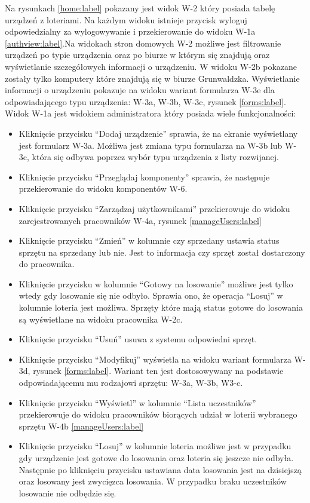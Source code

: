 Na rysunkach \ref{home:label} pokazany jest widok W-2 który posiada tabelę urządzeń z loteriami. Na każdym widoku istnieje przycisk wyloguj odpowiedzialny za wylogowywanie i przekierowanie do widoku W-1a \ref{authview:label}.Na widokach stron domowych W-2 możliwe jest filtrowanie urządzeń po typie urządzenia oraz po biurze w którym się znajdują oraz wyświetlanie szczegółowych informacji o urządzeniu. W widoku W-2b pokazane zostały tylko komputery które znajdują się w biurze Grunwaldzka. Wyświetlanie informacji o urządzeniu pokazuje na widoku wariant formularza W-3e dla odpowiadającego typu urządzenia: W-3a, W-3b, W-3c, rysunek \ref{forms:label}. Widok W-1a jest widokiem administratora który posiada wiele funkcjonalności:
\begin{itemize}
	\item Kliknięcie przycisku "`Dodaj urządzenie"' sprawia, że na ekranie wyświetlany jest formularz W-3a. Możliwa jest zmiana typu formularza na W-3b lub W-3c, która się odbywa poprzez wybór typu urządzenia z listy rozwijanej.
	\item Kliknięcie przycisku "`Przeglądaj komponenty"' sprawia, że następuje przekierowanie do widoku komponentów W-6.
	\item Kliknięcie przycisku "`Zarządzaj użytkownikami"' przekierowuje do widoku zarejestrowanych pracowników W-4a, rysunek \ref{manageUsers:label}
	\item Kliknięcie przycisku "`Zmień"' w kolumnie czy sprzedany ustawia status sprzętu na sprzedany lub nie. Jest to informacja czy sprzęt został dostarczony do pracownika.
	\item Kliknięcie przycisku w kolumnie "`Gotowy na losowanie"' możliwe jest tylko wtedy gdy losowanie się nie odbyło. Sprawia ono, że operacja "`Losuj"' w kolumnie loteria jest możliwa. Sprzęty które mają status gotowe do losowania są wyświetlane na widoku pracownika W-2c.
	\item Kliknięcie przycisku "`Usuń"' usuwa z systemu odpowiedni sprzęt.
	\item Kliknięcie przycisku "`Modyfikuj"' wyświetla na widoku wariant formularza W-3d, rysunek \ref{forms:label}. Wariant ten jest dostosowywany na podstawie odpowiadającemu mu rodzajowi sprzętu: W-3a, W-3b, W3-c.
	\item Kliknięcie przycisku "`Wyświetl"' w kolumnie "`Lista uczestników"' przekierowuje do widoku pracowników biorących udział w loterii wybranego sprzętu W-4b \ref{manageUsers:label}
	\item Kliknięcie przycisku "`Losuj"' w kolumnie loteria możliwe jest w przypadku gdy urządzenie jest gotowe do losowania oraz loteria się jeszcze nie odbyła. Następnie po kliknięciu przycisku ustawiana data losowania jest na dzisiejszą oraz losowany jest zwycięzca losowania. W przypadku braku uczestników losowanie nie odbędzie się.
\end{itemize}
